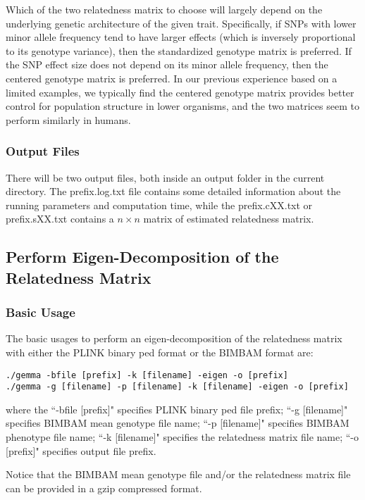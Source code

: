 \documentclass[11pt]{article}
\begin{document}
Which of the two relatedness matrix to choose will largely depend on the underlying genetic architecture of the given trait. Specifically, if SNPs with lower minor allele frequency tend to have larger effects (which is inversely proportional to its genotype variance), then the standardized genotype matrix is preferred. If the SNP effect size does not depend on its minor allele frequency, then the centered genotype matrix is preferred. In our previous experience based on a limited examples, we typically find the centered genotype matrix provides better control for population structure in lower organisms, and the two matrices seem to perform similarly in humans. 




\subsubsection{Output Files}
There will be two output files, both inside an output folder in the current directory. The prefix.log.txt file contains some detailed information about the running parameters and computation time, while the prefix.cXX.txt or prefix.sXX.txt contains a $n\times n$ matrix of estimated relatedness matrix.



\subsection{Perform Eigen-Decomposition of the Relatedness Matrix}
\subsubsection{Basic Usage}
The basic usages to perform an eigen-decomposition of the relatedness matrix with either the PLINK binary ped format or the BIMBAM format are:
%
\begin{verbatim}
./gemma -bfile [prefix] -k [filename] -eigen -o [prefix]
./gemma -g [filename] -p [filename] -k [filename] -eigen -o [prefix]
\end{verbatim}
%
where the ``-bfile [prefix]" specifies PLINK binary ped file prefix; ``-g [filename]" specifies BIMBAM mean genotype file name; ``-p [filename]" specifies BIMBAM phenotype file name; ``-k [filename]" specifies the relatedness matrix file name; ``-o [prefix]" specifies output file prefix. 

Notice that the BIMBAM mean genotype file and/or the relatedness matrix file can be provided in a gzip compressed format.
\end{document}
